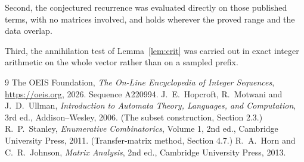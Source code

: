 \documentclass[11pt,a4paper]{article}
\theoremstyle{plain}
\theoremstyle{definition}
\begin{document}
Second, the conjectured recurrence was evaluated directly on those published terms, with no
matrices involved, and holds wherever the proved range and the data overlap.

Third, the annihilation test of Lemma~\ref{lem:crit} was carried out in exact integer
arithmetic on the whole vector rather than on a sampled prefix.

\begin{thebibliography}{9}
 The OEIS Foundation, \emph{The On-Line Encyclopedia of Integer
Sequences}, \url{https://oeis.org}, 2026. Sequence A220994.
 J.~E.~Hopcroft, R.~Motwani and J.~D.~Ullman, \emph{Introduction to Automata
Theory, Languages, and Computation}, 3rd ed., Addison--Wesley, 2006. (The subset
construction, Section 2.3.)
 R.~P.~Stanley, \emph{Enumerative Combinatorics}, Volume 1, 2nd ed.,
Cambridge University Press, 2011. (Transfer-matrix method, Section 4.7.)
 R.~A.~Horn and C.~R.~Johnson, \emph{Matrix Analysis}, 2nd ed., Cambridge
University Press, 2013.
\end{thebibliography}
\end{document}
